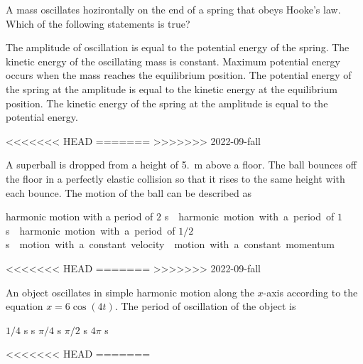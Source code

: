 \documentclass{../../oss-apphys-exam}
\begin{document}
\genheader



\raggedcolumns
\begin{multicols*}{2}
  \begin{questions}
    \question A mass oscillates hozirontally on the end of a spring that obeys
    Hooke's law. Which of the following statements is true?
    \begin{choices}
      \choice The amplitude of oscillation is equal to the potential energy of
      the spring.
      \choice The kinetic energy of the oscillating mass is constant.
      \choice Maximum potential energy occurs when the mass reaches the
      equilibrium position.
      \choice The potential energy of the spring at the amplitude is equal to
      the kinetic energy at the equilibrium position.
      \choice The kinetic energy of the spring at the amplitude is equal to the
      potential energy.
    \end{choices}
<<<<<<< HEAD
    \vspace{.7in}
=======
    \vspace{.55in}
>>>>>>> 2022-09-fall
    
    \question A superball is dropped from a height of \SI{5.}{\metre} above a
    floor. The ball bounces off the floor in a perfectly elastic collision so
    that it rises to the same height with each bounce. The motion of the ball
    can be described as
    \begin{choices}
      \choice harmonic motion with a period of $2$ \si\second
      \choice harmonic motion with a period of $1$ \si\second
      \choice harmonic motion with a period of $1/2$ \si\second
      \choice motion with a constant velocity
      \choice motion with a constant momentum
    \end{choices}
<<<<<<< HEAD
    \vspace{.7in}
=======
    \vspace{.55in}
>>>>>>> 2022-09-fall
    
    \question An object oscillates in simple harmonic motion along the $x$-axis
    according to the equation $x=6\cos(4t)$. The period of oscillation of the
    object is
    \begin{choices}
      \choice $1/4$ s
       s
      \choice $\pi/4$ s
      \choice $\pi/2$ s
      \choice $4\pi$ s
    \end{choices}
<<<<<<< HEAD
    \columnbreak
=======


\end{questions}
\end{multicols*}
\end{document}
